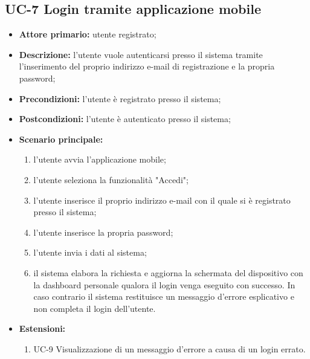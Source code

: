 \subsection{UC-7 Login tramite applicazione mobile}
\begin{itemize}
	\item \textbf{Attore primario:} utente registrato;

	\item \textbf{Descrizione:} l'utente vuole autenticarsi presso il sistema tramite l'inserimento del proprio indirizzo e-mail di registrazione e la propria password;

	\item \textbf{Precondizioni:} l'utente è registrato presso il sistema;

	\item \textbf{Postcondizioni:} l'utente è autenticato presso il sistema;

	\item\textbf{Scenario principale:}

	      \begin{enumerate}
		      \item l'utente avvia l'applicazione mobile;
		      \item l'utente seleziona la funzionalità "Accedi";
		      \item l'utente inserisce il proprio indirizzo e-mail con il quale si è registrato presso il sistema;
		      \item l'utente inserisce la propria password;
		      \item l'utente invia i dati al sistema;
		      \item il sistema elabora la richiesta e aggiorna la schermata del dispositivo con la dashboard personale qualora il login venga eseguito con successo. In caso contrario il sistema restituisce un messaggio d'errore esplicativo e non completa il login dell'utente.
	      \end{enumerate}
	\item \textbf{Estensioni:}
	      \begin{enumerate}
		      \item UC-9 Visualizzazione di un messaggio d'errore a causa di un login errato.
	      \end{enumerate}
\end{itemize}
